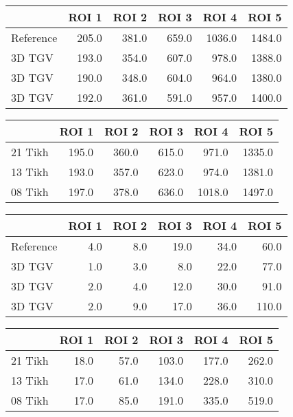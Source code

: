 \begin{tabular}{lrrrrr}
\toprule
{} &  ROI 1 &  ROI 2 &  ROI 3 &   ROI 4 &   ROI 5 \\
\midrule
Reference &  205.0 &  381.0 &  659.0 &  1036.0 &  1484.0 \\
3D TGV    &  193.0 &  354.0 &  607.0 &   978.0 &  1388.0 \\
3D TGV    &  190.0 &  348.0 &  604.0 &   964.0 &  1380.0 \\
3D TGV    &  192.0 &  361.0 &  591.0 &   957.0 &  1400.0 \\
\bottomrule
\end{tabular}
\begin{tabular}{lrrrrr}
\toprule
{} &  ROI 1 &  ROI 2 &  ROI 3 &   ROI 4 &   ROI 5 \\
\midrule
21 Tikh &  195.0 &  360.0 &  615.0 &   971.0 &  1335.0 \\
13 Tikh &  193.0 &  357.0 &  623.0 &   974.0 &  1381.0 \\
08 Tikh &  197.0 &  378.0 &  636.0 &  1018.0 &  1497.0 \\
\bottomrule
\end{tabular}
\begin{tabular}{lrrrrr}
\toprule
{} &  ROI 1 &  ROI 2 &  ROI 3 &  ROI 4 &  ROI 5 \\
\midrule
Reference &    4.0 &    8.0 &   19.0 &   34.0 &   60.0 \\
3D TGV    &    1.0 &    3.0 &    8.0 &   22.0 &   77.0 \\
3D TGV    &    2.0 &    4.0 &   12.0 &   30.0 &   91.0 \\
3D TGV    &    2.0 &    9.0 &   17.0 &   36.0 &  110.0 \\
\bottomrule
\end{tabular}
\begin{tabular}{lrrrrr}
\toprule
{} &  ROI 1 &  ROI 2 &  ROI 3 &  ROI 4 &  ROI 5 \\
\midrule
21 Tikh &   18.0 &   57.0 &  103.0 &  177.0 &  262.0 \\
13 Tikh &   17.0 &   61.0 &  134.0 &  228.0 &  310.0 \\
08 Tikh &   17.0 &   85.0 &  191.0 &  335.0 &  519.0 \\
\bottomrule
\end{tabular}
